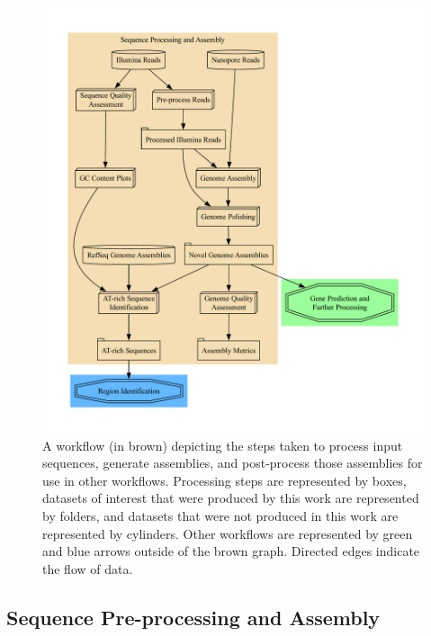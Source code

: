\begin{figure}
  \centering
  \includegraphics[width=\textwidth]{figures/assembly-met.pdf}
  \caption[Sequence assembly and processing workflow]{A workflow (in brown) depicting the steps taken to process
    input sequences, generate assemblies, and post-process those
    assemblies for use in other workflows. Processing steps are
    represented by boxes, datasets of interest that were produced by
    this work are represented by folders, and datasets that were not
    produced in this work are represented by cylinders. Other
    workflows are represented by green and blue arrows outside of the
    brown graph. Directed edges indicate the flow of data.}
  \label{fig:seq-workflow}
\end{figure}

\subsection{Sequence Pre-processing and Assembly}
\label{met:seq-process}

